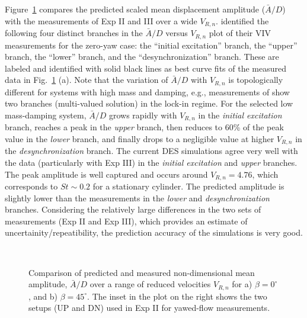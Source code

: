 Figure~\ref{fig:VIV_amp} compares the predicted scaled mean displacement
amplitude ($\bar{A}/D$) with the measurements of Exp II and III over a wide
$V_{R,n}$. \citet{khalak1997fluid} identified the following four distinct
branches in the $\bar{A}/D$ versus $V_{R,n}$ plot of their VIV measurements for
the zero-yaw case: the ``initial excitation'' branch, the ``upper'' branch, the
``lower'' branch, and the ``desynchronization'' branch. These are labeled and
identified with solid black lines as best curve fits of the measured data in
Fig.~\ref{fig:VIV_amp} (a). Note that the variation of $\bar{A}/D$ with
$V_{R,n}$ is topologically different for systems with high mass and damping,
e.g., measurements of \citet{feng1968measurement} show two branches
(multi-valued solution) in the lock-in regime. For the selected low
mass-damping system, $\bar{A}/D$ grows rapidly with $V_{R,n}$ in the {\em
initial excitation} branch, reaches a peak in the {\em upper} branch, then
reduces to 60\% of the peak value in the {\em lower} branch, and finally drops
to a negligible value at higher $V_{R,n}$ in the {\em desynchronization}
branch. The current DES simulations agree very well with the data (particularly
with Exp III) in the {\em initial excitation} and {\em upper} branches. The
peak amplitude is well captured and occurs around $V_{R,n}=4.76$, which
corresponds to $St\sim0.2$ for a stationary cylinder. The predicted amplitude
is slightly lower than the measurements in the {\em lower} and {\em
desynchronization} branches.  Considering the relatively large differences in
the two sets of measurements (Exp II and Exp III), which provides an estimate
of uncertainity/repeatibility, the prediction accuracy of the simulations is
very good.
%
\begin{figure}[htb!]
  \centering
   {}
  \qquad
   \\
    \caption{Comparison of predicted and measured non-dimensional mean
      amplitude, $\bar{A}/D$ over a range of reduced velocities $V_{R,n}$ for
      a) $\beta=0^\circ$, and b) $\beta=45^\circ$. The inset in the plot on the
      right shows the two setups (UP and DN) used in Exp II for yawed-flow
      measurements.} 
  \label{fig:VIV_amp}
\end{figure}

